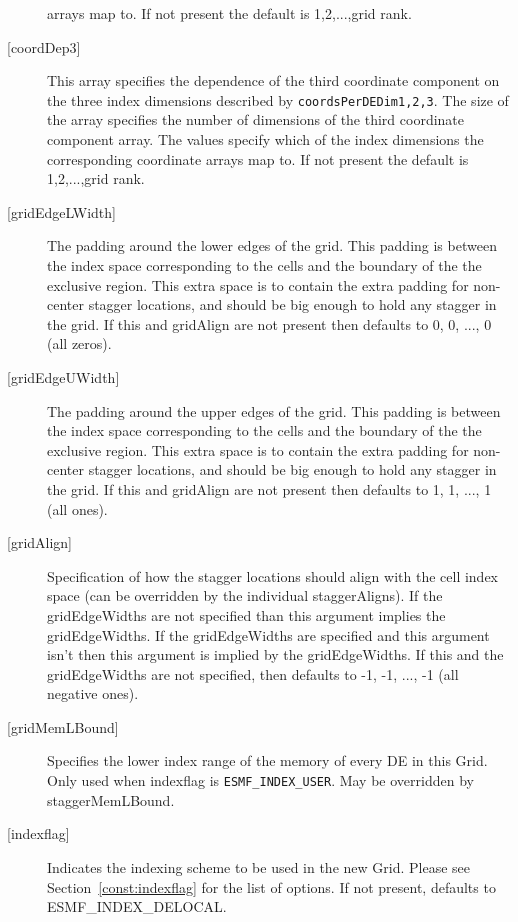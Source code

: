 \begin{description}
       arrays map to. If not present the default is 1,2,...,grid rank.
   \item[{[coordDep3]}]
       This array specifies the dependence of the third
       coordinate component on the three index dimensions
       described by {\tt coordsPerDEDim1,2,3}. The size of the
       array specifies the number of dimensions of the third
       coordinate component array. The values specify which
       of the index dimensions the corresponding coordinate
       arrays map to. If not present the default is 1,2,...,grid rank.
   \item[{[gridEdgeLWidth]}]
        The padding around the lower edges of the grid. This padding is between
        the index space corresponding to the cells and the boundary of the
        the exclusive region. This extra space is to contain the extra
        padding for non-center stagger locations, and should be big enough
        to hold any stagger in the grid. If this and gridAlign are not present then
        defaults to 0, 0, ..., 0 (all zeros).
   \item[{[gridEdgeUWidth]}]
        The padding around the upper edges of the grid. This padding is between
        the index space corresponding to the cells and the boundary of the
        the exclusive region. This extra space is to contain the extra
        padding for non-center stagger locations, and should be big enough
        to hold any stagger in the grid. If this and gridAlign are not present then
        defaults to 1, 1, ..., 1 (all ones).
   \item[{[gridAlign]}]
       Specification of how the stagger locations should align with the cell
       index space (can be overridden by the individual staggerAligns). If
       the gridEdgeWidths are not specified than this argument
       implies the gridEdgeWidths. If the gridEdgeWidths are specified and this argument isn't
       then this argument is implied by the gridEdgeWidths.
       If this and the gridEdgeWidths are not specified, then defaults to
      -1, -1, ..., -1 (all negative ones).
   \item[{[gridMemLBound]}]
        Specifies the lower index range of the memory of every DE in this Grid.
        Only used when indexflag is {\tt ESMF\_INDEX\_USER}. May be overridden
        by staggerMemLBound.
   \item[{[indexflag]}]
        Indicates the indexing scheme to be used in the new Grid. Please see
        Section~\ref{const:indexflag} for the list of options. If not present,
        defaults to ESMF\_INDEX\_DELOCAL.

\end{description}
